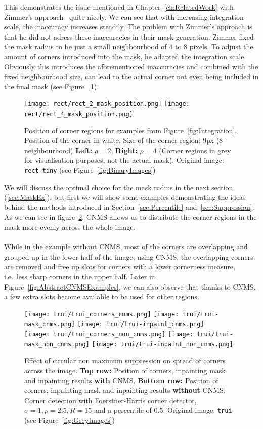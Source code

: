 \noindent This demonstrates the issue mentioned in Chapter~\ref{ch:RelatedWork} with Zimmer's approach~\cite{zimmer07} quite nicely. 
We can see that with increasing integration scale, the inaccuracy increases
steadily. The problem with Zimmer's approach is that he did not adress these inaccuracies in
their mask generation. Zimmer fixed the mask radius to be just a small neighbourhood of 4 to 8 pixels.
To adjust the amount of corners introduced into the mask, he adapted the integration scale.
Obviously this introduces the aforementioned inaccuracies and combined with the fixed neighbourhood
size, can lead to the actual corner not even being included in the final mask (see Figure
~\ref{fig:Inacc}).
\begin{figure}[h]
    \centering
    \texttt{[image: rect/rect\_2\_mask\_position.png]}
    \texttt{[image: rect/rect\_4\_mask\_position.png]}
    \caption{Position of corner regions for examples from Figure~\ref{fig:Integration}.
        Position of the corner in white. Size of the corner region: 9px (8-neighbourhood)
    \textbf{Left:} $\rho=2$, \textbf{Right:} $\rho=4$ (Corner regions in grey for visualisation
purposes, not the actual mask). Original image: \texttt{rect\_tiny} (see Figure~\ref{fig:BinaryImages})}\label{fig:Inacc}
\end{figure}
We will discuss the optimal choice for the mask radius in the next section (\ref{sec:MaskEx}), but
first we will show some examples demonstrating the ideas behind the methods introduced in
Section~\ref{sec:Percentile} and~\ref{sec:Suppression}. As we can see in
figure~\ref{fig:CNMSExample}, CNMS allows us to distribute the corner regions in the mask more
evenly across the whole image. \\\ \\
While in the example without CNMS, most of the corners are
overlapping and grouped up in the lower half of the image; using CNMS, the overlapping corners are
removed and free up slots for corners with a lower cornerness measure, i.e.\ less sharp corners in
the upper half. Later in Figure~\ref{fig:AbstractCNMSExamples}, we can also observe that thanks to
CNMS, a few extra slots become available to be used for other regions.
\begin{figure}
    \centering
    \texttt{[image: trui/trui\_corners\_cnms.png]}
    \texttt{[image: trui/trui-mask\_cnms.png]}
    \texttt{[image: trui/trui-inpaint\_cnms.png]}\\
    \vspace{0.2cm}
    \texttt{[image: trui/trui\_corners\_non\_cnms.png]}
    \texttt{[image: trui/trui-mask\_non\_cnms.png]}
    \texttt{[image: trui/trui-inpaint\_non\_cnms.png]}
    \caption{Effect of circular non maximum suppression on spread of corners across the image.
        \textbf{Top row:} Position of corners, inpainting mask and inpainting results
        \textbf{with} CNMS\@.
\textbf{Bottom row:} Position of corners, inpainting mask and inpainting results \textbf{without}
CNMS\@.
    Corner detection with Foerstner-Harris corner detector, $\sigma=1,\rho=2.5,R=15$ and a
percentile of 0.5. Original image: \texttt{trui} (see Figure~\ref{fig:GreyImages})}\label{fig:CNMSExample}
\end{figure}
